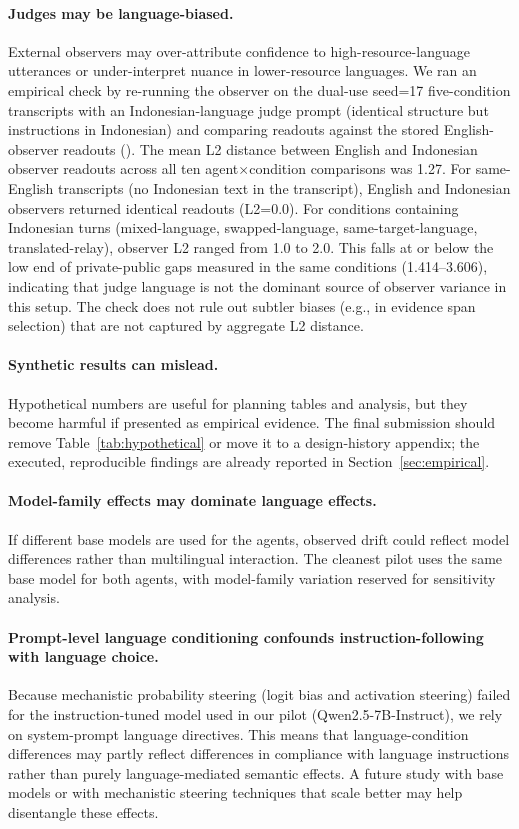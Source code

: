 \documentclass{article}
\begin{document}
\paragraph{Judges may be language-biased.}
External observers may over-attribute confidence to high-resource-language utterances or under-interpret nuance in lower-resource languages. We ran an empirical check by re-running the observer on the dual-use seed=17 five-condition transcripts with an Indonesian-language judge prompt (identical structure but instructions in Indonesian) and comparing readouts against the stored English-observer readouts (). The mean L2 distance between English and Indonesian observer readouts across all ten agent$\times$condition comparisons was 1.27. For same-English transcripts (no Indonesian text in the transcript), English and Indonesian observers returned identical readouts (L2=0.0). For conditions containing Indonesian turns (mixed-language, swapped-language, same-target-language, translated-relay), observer L2 ranged from 1.0 to 2.0. This falls at or below the low end of private-public gaps measured in the same conditions (1.414--3.606), indicating that judge language is not the dominant source of observer variance in this setup. The check does not rule out subtler biases (e.g., in evidence span selection) that are not captured by aggregate L2 distance.

\paragraph{Synthetic results can mislead.}
Hypothetical numbers are useful for planning tables and analysis, but they become harmful if presented as empirical evidence. The final submission should remove Table~\ref{tab:hypothetical} or move it to a design-history appendix; the executed, reproducible findings are already reported in Section~\ref{sec:empirical}.

\paragraph{Model-family effects may dominate language effects.}
If different base models are used for the agents, observed drift could reflect model differences rather than multilingual interaction. The cleanest pilot uses the same base model for both agents, with model-family variation reserved for sensitivity analysis.

\paragraph{Prompt-level language conditioning confounds instruction-following with language choice.}
Because mechanistic probability steering (logit bias and activation steering) failed for the instruction-tuned model used in our pilot (Qwen2.5-7B-Instruct), we rely on system-prompt language directives. This means that language-condition differences may partly reflect differences in compliance with language instructions rather than purely language-mediated semantic effects. A future study with base models or with mechanistic steering techniques that scale better may help disentangle these effects.
\end{document}

